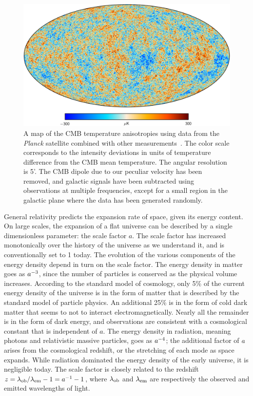 \begin{figure}[tb]
\centering
\includegraphics[width=\textwidth]{cmb/2015_SMICA_CMB.png}
\caption[A map of the CMB temperature anisotropies from the \textit{Planck} satellite.]
{
A map of the CMB temperature anisotropies using data from the \textit{Planck} satellite combined with other measurements~\autocite{Planck2015I}.
The color scale corresponds to the intensity deviations in units of temperature difference from the CMB mean temperature.
The angular resolution is 5'.
The CMB dipole due to our peculiar velocity has been removed, and galactic signals have been subtracted using observations at multiple frequencies, except for a small region in the galactic plane where the data has been generated randomly.
}
\label{fig:2015_SMICA_CMB}
\end{figure}

General relativity predicts the expansion rate of space, given its energy content.
On large scales, the expansion of a flat universe can be described by a single dimensionless parameter: the scale factor $a$.
The scale factor has increased monotonically over the history of the universe as we understand it, and is conventionally set to 1 today.
The evolution of the various components of the energy density depend in turn on the scale factor.
The energy density in matter goes as $a^{-3}$, since the number of particles is conserved as the physical volume increases.
According to the standard model of cosmology, only 5\% of the current energy density of the universe is in the form of matter that is described by the standard model of particle physics.
An additional 25\% is in the form of cold dark matter that seems to not to interact electromagnetically.
Nearly all the remainder is in the form of dark energy, and observations are consistent with a cosmological constant that is independent of $a$.
The energy density in radiation, meaning photons and relativistic massive particles, goes as $a^{-4}$; the additional factor of $a$ arises from the cosmological redshift, or the stretching of each mode as space expands.
While radiation dominated the energy density of the early universe, it is negligible today.
The scale factor is closely related to the redshift
$z
  =
  \lambda_\mathrm{ob} / \lambda_\mathrm{em} - 1
  =
  a^{-1} - 1$,
where $\lambda_\mathrm{ob}$ and $\lambda_\mathrm{em}$ are respectively the observed and emitted wavelengths of light.

